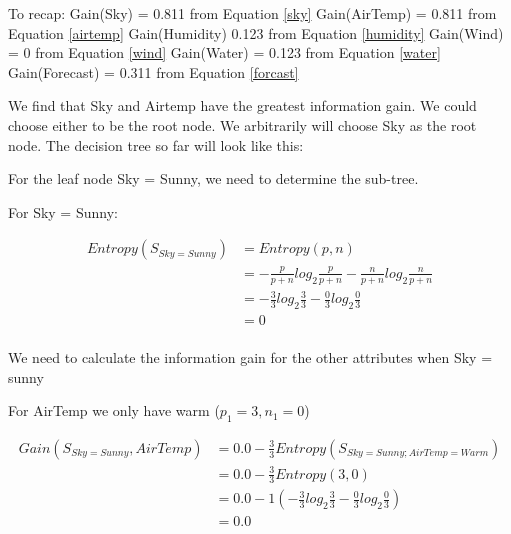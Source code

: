 \documentclass[10pt,a4paper]{article}
\begin{document}
{{{{{{{{{{To recap: 
\newline
Gain(Sky) = 0.811 from Equation \ref{sky} \newline
Gain(AirTemp) = 0.811 from Equation \ref{airtemp} \newline
Gain(Humidity) 0.123 from Equation \ref{humidity} \newline
Gain(Wind) = 0 from Equation \ref{wind} \newline
Gain(Water) = 0.123 from Equation \ref{water} \newline
Gain(Forecast) = 0.311 from Equation \ref{forcast} \newline


We find that Sky and Airtemp have the greatest information gain. We could choose either to be the root node. We arbitrarily will choose Sky as the root node. The decision tree so far will look like this:



For the leaf node Sky = Sunny, we need to determine the sub-tree.

For Sky = Sunny:

\begin{equation}
\begin{split}
Entropy(S_{Sky=Sunny}) &= Entropy(p,n) \\
                       &= -\frac{p}{p+n}log_2\frac{p}{p+n} - \frac{n}{p+n}log_2\frac{n}{p+n}  \\
                       &= -\frac{3}{3} log_2\frac{3}{3} -\frac{0}{3} log_2\frac{0}{3} \\
                       &= 0   \\
\end{split}
\end{equation}

We need to calculate the information gain for the other attributes when Sky = sunny

For AirTemp we only have warm ($p_1=3,n_1=0$)

\begin{equation}
\begin{split}
Gain(S_{Sky=Sunny},AirTemp) &= 0.0 - \frac{3}{3} Entropy(S_{Sky=Sunny;AirTemp=Warm} )\\
          &= 0.0 - \frac{3}{3} Entropy(3,0) \\
          &= 0.0 - 1( -\frac{3}{3} log_2\frac{3}{3} -\frac{0}{3} log_2\frac{0}{3} )  \\
          &= 0.0 \\
\end{split}
\end{equation}

}}}}}}}}}}
\end{document}
